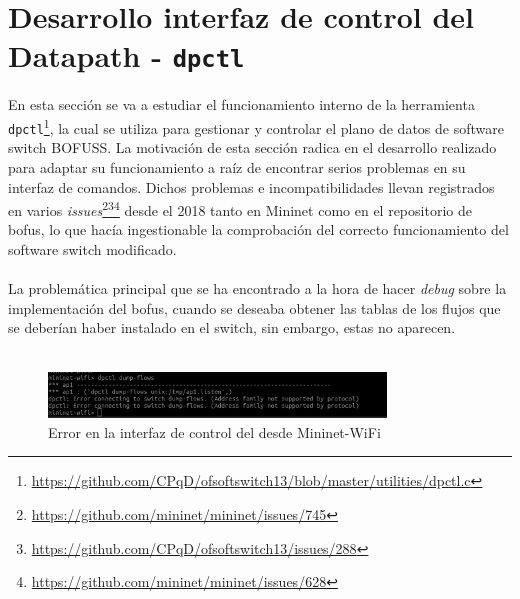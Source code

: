 \section{Desarrollo interfaz de control del Datapath - \texttt{dpctl}}
\label{sec:dpctl}

En esta sección se va a estudiar el funcionamiento interno de la herramienta \texttt{dpctl}\footnote{\url{https://github.com/CPqD/ofsoftswitch13/blob/master/utilities/dpctl.c}}, la cual se utiliza para gestionar y controlar el plano de datos de software switch BOFUSS. La motivación de esta sección radica en el desarrollo realizado para adaptar su funcionamiento a raíz de encontrar serios problemas en su interfaz de comandos. Dichos problemas e incompatibilidades llevan registrados en varios \textit{issues}\footnote{\url{https://github.com/mininet/mininet/issues/745}}\footnote{\url{https://github.com/CPqD/ofsoftswitch13/issues/288}}\footnote{\url{https://github.com/mininet/mininet/issues/628}} desde el 2018 tanto en Mininet como en el repositorio de \gls{bofus}, lo que hacía ingestionable la comprobación del correcto funcionamiento del software switch modificado.\\
\\
La problemática principal que se ha encontrado a la hora de hacer \textit{debug} sobre la implementación del \gls{bofus}, cuando se deseaba obtener las tablas de los flujos que se deberían haber instalado en el switch, sin embargo, estas no aparecen.\\
\\

\begin{figure}[ht]
    \centering
    \includegraphics[width=0.8\textwidth]{archivos/img/dev/dpctl_1.png}
    \caption{Error en la interfaz de control del  desde Mininet-WiFi}
    \label{fig:dpctl_1}
\end{figure}


